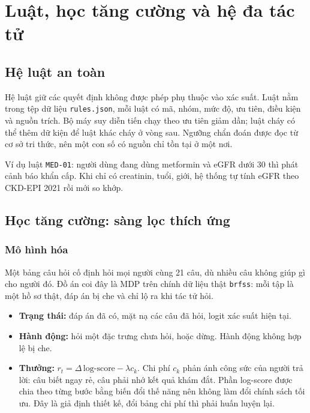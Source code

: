 \chapter{Luật, học tăng cường và hệ đa tác tử}\label{chap:tactu}

\section{Hệ luật an toàn}

Hệ luật giữ các quyết định không được phép phụ thuộc vào xác suất. Luật nằm trong tệp dữ liệu \texttt{rules.json}, mỗi luật có mã, nhóm, mức độ, ưu tiên, điều kiện và nguồn trích. Bộ máy suy diễn tiến chạy theo ưu tiên giảm dần; luật cháy có thể thêm dữ kiện để luật khác cháy ở vòng sau. Ngưỡng chẩn đoán được đọc từ cơ sở tri thức, nên một con số có nguồn chỉ tồn tại ở một nơi.



Ví dụ luật \texttt{MED-01}: người dùng đang dùng metformin và eGFR dưới 30 thì phát cảnh báo khẩn cấp. Khi chỉ có creatinin, tuổi, giới, hệ thống tự tính eGFR theo CKD-EPI 2021 rồi mới so khớp.


\section{Học tăng cường: sàng lọc thích ứng}

\subsection{Mô hình hóa}

Một bảng câu hỏi cố định hỏi mọi người cùng 21 câu, dù nhiều câu không giúp gì cho người đó. Đồ án coi đây là MDP trên chính dữ liệu thật \texttt{brfss}: mỗi tập là một hồ sơ thật, đáp án bị che và chỉ lộ ra khi tác tử hỏi.

\begin{itemize}
  \item \textbf{Trạng thái:} đáp án đã có, mặt nạ các câu đã hỏi, logit xác suất hiện tại.
  \item \textbf{Hành động:} hỏi một đặc trưng chưa hỏi, hoặc dừng. Hành động không hợp lệ bị che.
  \item \textbf{Thưởng:} $r_t=\Delta\,\text{log-score}-\lambda c_k$. Chi phí $c_k$ phản ánh công sức của người trả lời: câu biết ngay rẻ, câu phải nhớ kết quả khám đắt. Phần log-score được chia theo từng bước bằng biến đổi thế năng nên không làm đổi chính sách tối ưu. Đây là giả định thiết kế, đổi bảng chi phí thì phải huấn luyện lại.
\end{itemize}

